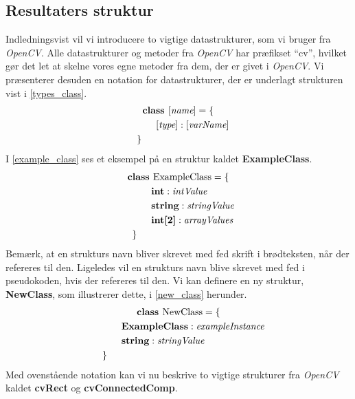 {\subsection{Resultaters struktur\label{resultat_struktur}}
Indledningsvist vil vi introducere to vigtige datastrukturer, som vi
bruger fra \emph{OpenCV}. Alle datastrukturer og metoder fra
\emph{OpenCV} har præfikset ``cv'', hvilket gør det let at skelne vores
egne metoder fra dem, der er givet i \emph{OpenCV}. Vi præsenterer
desuden en notation for datastrukturer, der er underlagt strukturen vist
i \eqref{types_class}.
\begin{multline}
    \textbf{class~} [\textit{name}] = \{ \\
    \shoveleft{\qquad[\textit{type}] : [\textit{varName}]} \\
    \shoveleft{\}}\shoveright{}
    \label{types_class}
\end{multline}
I \eqref{example_class} ses et eksempel på en struktur kaldet
\textbf{ExampleClass}.
\begin{multline}
    \textbf{class~} \textrm{ExampleClass} = \{ \\
    \shoveleft{\qquad\textbf{int} : \textit{intValue}} \\
    \shoveleft{\qquad\textbf{string} : \textit{stringValue}} \\
    \shoveleft{\qquad\textbf{int[2]} : \textit{arrayValues}} \\
    \shoveleft{\}}\shoveright{}
    \label{example_class}
\end{multline}
Bemærk, at en strukturs navn bliver skrevet med fed skrift i
brødteksten, når der refereres til den. Ligeledes vil en strukturs navn
blive skrevet med fed i pseudokoden, hvis der refereres til den. Vi kan
definere en ny struktur, \textbf{NewClass}, som illustrerer dette, i
\eqref{new_class} herunder.
\begin{multline}
    \textbf{class~} \textrm{NewClass} = \{ \\
    \shoveleft{\qquad\textbf{ExampleClass} : \textit{exampleInstance}} \\
    \shoveleft{\qquad\textbf{string} : \textit{stringValue}} \\
    \shoveleft{\}}\shoveright{}
    \label{new_class}
\end{multline}
Med ovenstående notation kan vi nu beskrive to vigtige strukturer fra
\emph{OpenCV} kaldet \textbf{cvRect} og \textbf{cvConnectedComp}.

}
